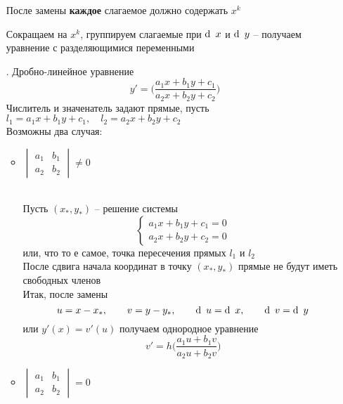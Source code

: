 \begin{enumerate}
    \begin{control}
        После замены \textbf{каждое} слагаемое должно содержать $ x^k $
    \end{control}
    Сокращаем на $ x^k $, группируем слагаемые при $ \di x $ и $ \di y $ -- получаем уравнение с разделяющимися переменными
    \item[\rom7.] Дробно-линейное уравнение
    $$ y' = \bigg( \frac{a_1x + b_1y + c_1}{a_2x + b_2y + c_2} \bigg) $$
    Числитель и значенатель задают прямые, пусть $ l_1 = a_1x + b_1y + c_1, \quad l_2 = a_2x + b_2y + c_2 $ \\
    Возможны два случая:
    \begin{itemize}
    	\item $
        \begin{vmatrix}
        	a_1 & b_1 \\
            a_2 & b_2
        \end{vmatrix} \ne 0 $
        \begin{figure}[!h]
        \end{figure} \\
        Пусть $ (x_*, y_*) $ -- решение системы
        $$
        \begin{cases}
        	a_1x + b_1y + c_1 = 0 \\
            a_2x + b_2y + c_2 = 0
        \end{cases} $$
        или, что то е самое, точка пересечения прямых $ l_1 $ и $ l_2 $ \\
        После сдвига начала координат в точку $ (x_*, y_*) $ прямые не будут иметь свободных членов \\
        Итак, после замены
        $$ u = x - x_*, \qquad v = y - y_*, \qquad \di u = \di x, \qquad \di v = \di y $$
        или $ y'(x) = v'(u) $ получаем однородное уравнение
        $$ v' = h \bigg( \frac{a_1u + b_1v}{a_2u + b_2v} \bigg) $$
        \item $
        \begin{vmatrix}
        	a_1 & b_1 \\
            a_2 & b_2
        \end{vmatrix} = 0 $

\end{itemize}
\end{enumerate}
